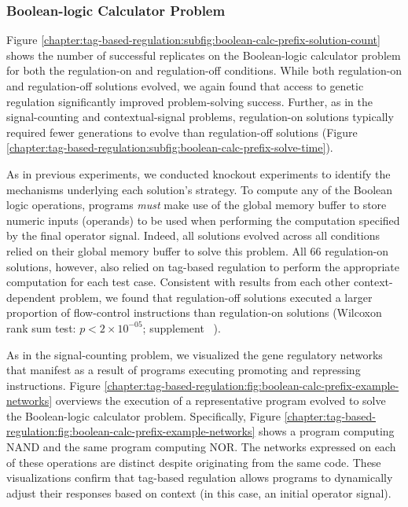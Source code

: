 \subsubsection{Boolean-logic Calculator Problem}
\label{chapter:tag-based-regulation:sec:results:boolean-calc-problem}



Figure \ref{chapter:tag-based-regulation:subfig:boolean-calc-prefix-solution-count} shows the number of successful replicates on the Boolean-logic calculator problem for both the regulation-on and regulation-off conditions.
While both regulation-on and regulation-off solutions evolved, we again found that access to genetic regulation significantly improved problem-solving success.
Further, as in the signal-counting and contextual-signal problems, regulation-on solutions typically required fewer generations to evolve than regulation-off solutions (Figure \ref{chapter:tag-based-regulation:subfig:boolean-calc-prefix-solve-time}).



As in previous experiments, we conducted knockout experiments to identify the mechanisms underlying each solution's strategy.
To compute any of the Boolean logic operations, programs \textit{must} make use of the global memory buffer to store numeric inputs (operands) to be used when performing the computation specified by the final operator signal. 
Indeed, all solutions evolved across all conditions relied on their global memory buffer to solve this problem.
All 66 regulation-on solutions, however, also relied on tag-based regulation to perform the appropriate computation for each test case.
Consistent with results from each other context-dependent problem, we found that regulation-off solutions executed a larger proportion of flow-control instructions than regulation-on solutions (Wilcoxon rank sum test: $p < 2\times10^{-05}$; supplement \supSecBooleanCalcPrefixAnalysis\ \citep{tag_regulation_supplement_2021}).

As in the signal-counting problem, we visualized the gene regulatory networks that manifest as a result of programs executing promoting and repressing instructions. 
Figure \ref{chapter:tag-based-regulation:fig:boolean-calc-prefix-example-networks} overviews the execution of a representative program evolved to solve the Boolean-logic calculator problem.
Specifically, Figure \ref{chapter:tag-based-regulation:fig:boolean-calc-prefix-example-networks} shows a program computing NAND and the same program computing NOR. 
The networks expressed on each of these operations are distinct despite originating from the same code.
These visualizations confirm that tag-based regulation allows programs to dynamically adjust their responses based on context (in this case, an initial operator signal). 

